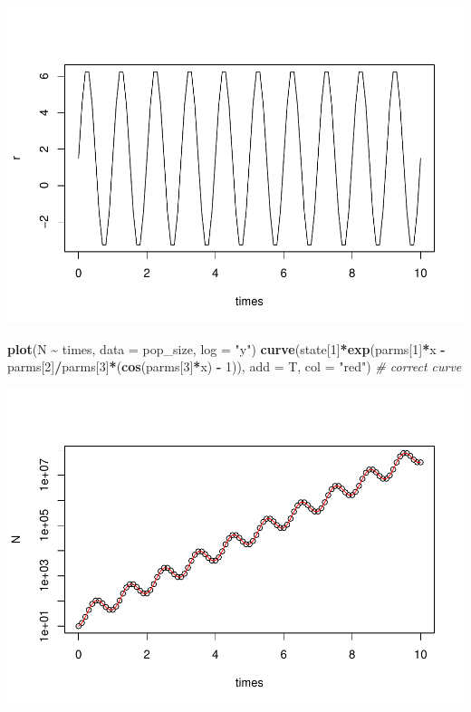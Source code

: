 \documentclass[
]{book}
\newenvironment{Shaded}{\begin{snugshade}}{\end{snugshade}}
\newcommand{\AttributeTok}[1]{\textcolor[rgb]{0.13,0.29,0.53}{#1}}
\newcommand{\CommentTok}[1]{\textcolor[rgb]{0.56,0.35,0.01}{\textit{#1}}}
\newcommand{\DecValTok}[1]{\textcolor[rgb]{0.00,0.00,0.81}{#1}}
\newcommand{\FunctionTok}[1]{\textcolor[rgb]{0.13,0.29,0.53}{\textbf{#1}}}
\newcommand{\NormalTok}[1]{#1}
\newcommand{\SpecialCharTok}[1]{\textcolor[rgb]{0.81,0.36,0.00}{\textbf{#1}}}
\newcommand{\StringTok}[1]{\textcolor[rgb]{0.31,0.60,0.02}{#1}}
\begin{document}
\includegraphics{bookdown-demo_files/figure-latex/unnamed-chunk-10-1.pdf}

\begin{Shaded}
\begin{Highlighting}[]
\FunctionTok{plot}\NormalTok{(N }\SpecialCharTok{\textasciitilde{}}\NormalTok{ times, }\AttributeTok{data =}\NormalTok{ pop\_size, }\AttributeTok{log =} \StringTok{"y"}\NormalTok{)}
\FunctionTok{curve}\NormalTok{(state[}\DecValTok{1}\NormalTok{]}\SpecialCharTok{*}\FunctionTok{exp}\NormalTok{(parms[}\DecValTok{1}\NormalTok{]}\SpecialCharTok{*}\NormalTok{x }\SpecialCharTok{{-}}\NormalTok{ parms[}\DecValTok{2}\NormalTok{]}\SpecialCharTok{/}\NormalTok{parms[}\DecValTok{3}\NormalTok{]}\SpecialCharTok{*}\NormalTok{(}\FunctionTok{cos}\NormalTok{(parms[}\DecValTok{3}\NormalTok{]}\SpecialCharTok{*}\NormalTok{x) }\SpecialCharTok{{-}} \DecValTok{1}\NormalTok{)), }\AttributeTok{add =}\NormalTok{ T, }\AttributeTok{col =} \StringTok{"red"}\NormalTok{) }\CommentTok{\# correct curve}
\end{Highlighting}
\end{Shaded}

\includegraphics{bookdown-demo_files/figure-latex/unnamed-chunk-10-2.pdf}
\end{document}
